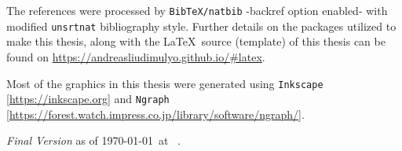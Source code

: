 {\noindent The references were processed by \texttt{BibTeX/natbib} -backref option enabled- with modified \texttt{unsrtnat} bibliography style. Further details on the packages utilized to make this thesis, along with the \LaTeX \ source (template) of this thesis can be found on \url{https://andreasliudimulyo.github.io/#latex}. \\

\begin{sloppypar}
\noindent Most of the graphics in this thesis were generated using \texttt{Inkscape} [\url{https://inkscape.org}] and \texttt{Ngraph} [\url{https://forest.watch.impress.co.jp/library/software/ngraph/}].
\end{sloppypar}

\vspace{4mm}

\noindent\emph{Final Version} as of \today \ at \ \currenttime. 
}